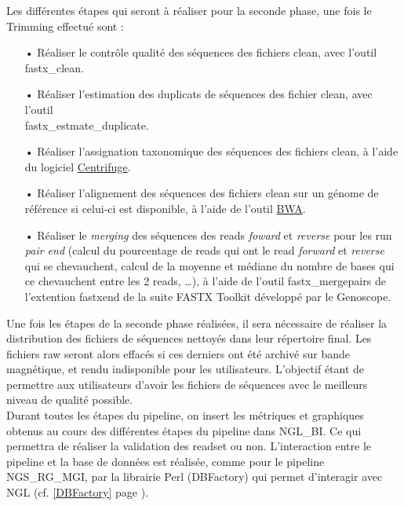Les différentes étapes qui seront à réaliser pour la seconde phase, une fois le Trimming effectué sont :\\
\begin{itemize}
    \item[•] Réaliser le contrôle qualité des séquences des fichiers clean, avec l'outil fastx\_clean.
    \item[•] Réaliser l'estimation des duplicats de séquences des fichier clean, avec l'outil \\fastx\_estmate\_duplicate.
    \item[•] Réaliser l'assignation taxonomique des séquences des fichiers clean, à l'aide du logiciel \href{https://ccb.jhu.edu/software/centrifuge/manual.shtml}{Centrifuge}.
    \item[•] Réaliser l'alignement des séquences des fichiers clean sur un génome de référence si celui-ci est disponible, à l'aide de l'outil \href{http://bio-bwa.sourceforge.net/bwa.shtml}{BWA}.
    \item[•] Réaliser le \og\emph{merging}\fg{} des séquences des reads \emph{foward} et \emph{reverse} pour les run \emph{pair end} (calcul du pourcentage de reads qui ont le read \emph{forward} et \emph{reverse} qui se chevauchent, calcul de la moyenne et médiane du nombre de bases qui ce chevauchent entre les 2 reads, \dots), à l'aide de l'outil fastx\_mergepairs de l'extention fastxend de la suite FASTX Toolkit développé par le Genoscope.\\
\end{itemize}

Une fois les étapes de la seconde phase réalisées, il sera nécessaire de réaliser la distribution des fichiers de séquences nettoyés dans leur répertoire final. Les fichiers raw seront alors effacés si ces derniers ont été archivé sur bande magnétique, et rendu indisponible pour les utilisateurs. L'objectif étant de permettre aux utilisateurs d'avoir les fichiers de séquences avec le meilleurs niveau de qualité possible.\\

Durant toutes les étapes du pipeline, on insert les métriques et graphiques obtenus au cours des différentes étapes du pipeline dans NGL\_BI. Ce qui permettra de réaliser la validation des readset ou non. L'interaction entre le pipeline et la base de données est réalisée, comme pour le pipeline NGS\_RG\_MGI, par la librairie Perl (DBFactory) qui permet d'interagir avec NGL (cf. \ref{DBFactory} page \pageref{DBFactory}).\\


